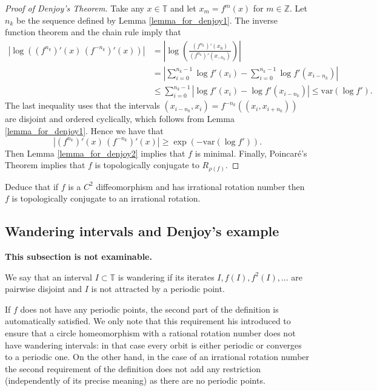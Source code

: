 \documentclass[12pt]{article}
\theoremstyle{definition}
\theoremstyle{remark}
\begin{document}
\begin{proof}[Proof of Denjoy's Theorem]
Take any $x \in \mathbb T$ and let $x_m = f^m(x)$
for $m \in \mathbb Z$. Let $n_k$ be the sequence defined by Lemma \ref{lemma_for_denjoy1}. 
The inverse
function theorem and the chain rule imply that
\begin{align*}
\left|\log\left((f^{n_k})'(x) \, (f^{-n_k})'(x)\right)\right|
&=
\left|\log\left(\frac{(f^{n_k})'(x_0)}{(f^{n_k})'(x_{-n_k})}\right)\right| \\
&=
\left|\sum_{i=0}^{n_k -1} \log f'(x_i)
- \sum_{i=0}^{n_k -1} \log f'(x_{i-n_k})\right| \\
&\le \sum_{i=0}^{n_k-1} |\log f'(x_i) - \log f'(x_{i-n_k})|
\le \mathrm{var}(\log f').
\end{align*}
The last inequality uses that the intervals
$(x_{i-n_k},x_i) = f^{-n_k}((x_i,x_{i+n_k}))$ are disjoint and ordered cyclically, which follows from Lemma 
\ref{lemma_for_denjoy1}. Hence we have that
\[
|(f^{n_k})'(x) \, (f^{-n_k})'(x) |\ge \exp(-\mathrm{var}(\log f')).
\]
Then Lemma \ref{lemma_for_denjoy2} implies that $f$ is minimal. Finally, Poincar\'e's Theorem implies that $f$ is topologically conjugate to $R_{\rho(f)}$.
\end{proof}

\noindent
Deduce that if $f$ is a $C^2$ diffeomorphism
and has irrational rotation number then $f$ is topologically conjugate to an irrational rotation.

\subsection{Wandering intervals and Denjoy's example}

\textbf{This subsection is not examinable.}

We say that an interval $I \subset \mathbb T$ is wandering if its iterates 
$I, f(I), f^2(I), \ldots$
are pairwise disjoint and $I$
is not attracted by a periodic point.

If $f$ does not have any periodic points, the second part of the definition is
automatically satisfied. We only note that this requirement his introduced
to ensure that a circle homeomorphism with a rational rotation number does
not have wandering intervals: in that case every orbit is either periodic or
converges to a periodic one. On the other hand, in the case of an irrational
rotation number the second requirement of the definition does not add any
restriction (independently of its precise meaning) as there are no periodic
points.
\end{document}
